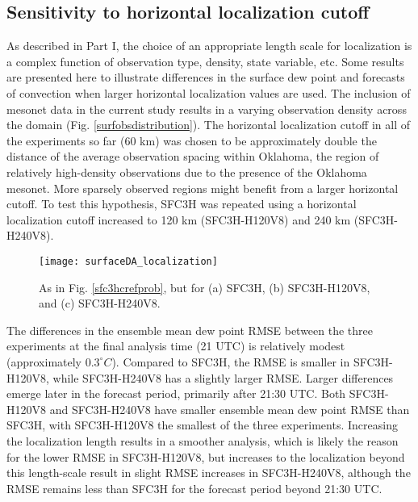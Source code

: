 \subsection{Sensitivity to horizontal localization cutoff}
As described in Part I, the choice of an appropriate length scale for localization is a complex function of observation type, density, state variable, etc. Some results are presented here to illustrate differences in the surface dew point and forecasts of convection when larger horizontal localization values are used. The inclusion of mesonet data in the current study results in a varying observation density across the domain (Fig. \ref{surfobsdistribution}). The horizontal localization cutoff in all of the experiments so far (60 km) was chosen to be approximately double the distance of the average observation spacing within Oklahoma, the region of relatively high-density observations due to the presence of the Oklahoma mesonet. More sparsely observed regions might benefit from a larger horizontal cutoff. To test this hypothesis, SFC3H was repeated using a horizontal localization cutoff increased to 120 km (SFC3H-H120V8) and 240 km (SFC3H-H240V8).

\begin{figure}
\centering
\texttt{[image: surfaceDA\_localization]}
\caption{As in Fig. \ref{sfc3hcrefprob}, but for (a) SFC3H, (b) SFC3H-H120V8, and (c) SFC3H-H240V8.}
\label{sfcdaloc}
\end{figure}

The differences in the ensemble mean dew point RMSE between the three experiments at the final analysis time (21 UTC) is relatively modest (approximately \(0.3^{\circ}C\)). Compared to SFC3H, the RMSE is smaller in SFC3H-H120V8, while SFC3H-H240V8 has a slightly larger RMSE. Larger differences emerge later in the forecast period, primarily after 21:30 UTC. Both SFC3H-H120V8 and SFC3H-H240V8 have smaller ensemble mean dew point RMSE than SFC3H, with SFC3H-H120V8 the smallest of the three experiments. Increasing the localization length results in a smoother analysis, which is likely the reason for the lower RMSE in SFC3H-H120V8, but increases to the localization beyond this length-scale result in slight RMSE increases in SFC3H-H240V8, although the RMSE remains less than SFC3H for the forecast period beyond 21:30 UTC.

